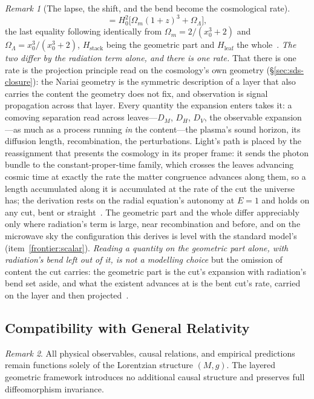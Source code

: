 \documentclass[11pt,a4paper]{article}
\theoremstyle{plain}
\theoremstyle{definition}
\theoremstyle{remark}
\newtheorem{remark}{Remark}
\begin{document}
\begin{remark}[The lapse, the shift, and the bend become the cosmological rate]
\begin{equation}
=H_0^{2}\big[\Omega_m(1+z)^{3}+\Omega_\Lambda\big],
\end{equation}
the last equality following identically from $\Omega_m=2/(x_0^{3}+2)$ and $\Omega_\Lambda=x_0^{3}/(x_0^{3}+2)$, $H_{\text{stack}}$ being the geometric part and $H_{\text{leaf}}$ the whole~\cite{JanzenCRcosmology}. \emph{The two differ by the radiation term alone, and there is one rate.} That there is one rate is the projection principle read on the cosmology's own geometry (\S\ref{sec:sds-closure}): the Nariai geometry is the symmetric description of a layer that also carries the content the geometry does not fix, and observation is signal propagation across that layer. Every quantity the expansion enters takes it: a comoving separation read across leaves---$D_M$, $D_H$, $D_V$, the observable expansion---as much as a process running \emph{in} the content---the plasma's sound horizon, its diffusion length, recombination, the perturbations. Light's path is placed by the reassignment that presents the cosmology in its proper frame: it sends the photon bundle to the constant-proper-time family, which crosses the leaves advancing cosmic time at exactly the rate the matter congruence advances along them, so a length accumulated along it is accumulated at the rate of the cut the universe has; the derivation rests on the radial equation's autonomy at $E=1$ and holds on any cut, bent or straight~\cite{JanzenCRcosmology}. The geometric part and the whole differ appreciably only where radiation's term is large, near recombination and before, and on the microwave sky the configuration this derives is level with the standard model's (item~\ref{frontier:scalar}). \emph{Reading a quantity on the geometric part alone, with radiation's bend left out of it, is not a modelling choice} but the omission of content the cut carries: the geometric part is the cut's expansion with radiation's bend set aside, and what the existent advances at is the bent cut's rate, carried on the layer and then projected~\cite{JanzenCRcosmology, JanzenCosmogenesis}.
\end{remark}

\subsection{Compatibility with General Relativity}

\begin{remark}
All physical observables, causal relations, and empirical predictions remain functions solely of the Lorentzian structure $(M,g)$. The layered geometric framework introduces no additional causal structure and preserves full diffeomorphism invariance.
\end{remark}
\end{document}
